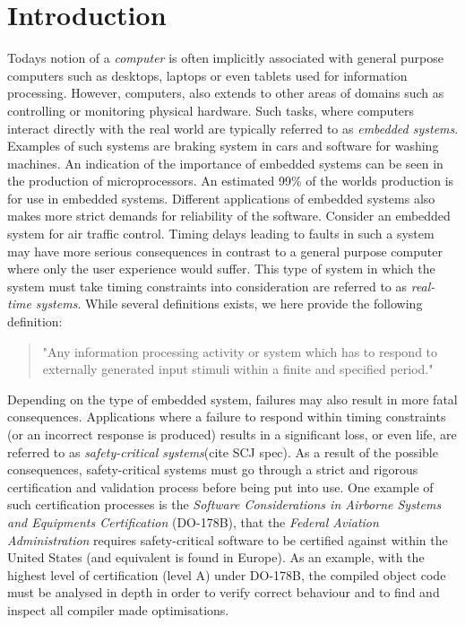 \chapter{Introduction}
\label{chapter:introduction}
Todays notion of a \textit{computer} is often implicitly associated with general purpose computers such as desktops, laptops or even tablets used for information processing. However, computers, also extends to other areas of domains such as controlling or monitoring physical hardware. Such tasks, where computers interact directly with the real world are typically referred to as \textit{embedded systems}. Examples of such systems are braking system in cars and software for washing machines. An indication of the importance of embedded systems can be seen in the production of microprocessors. An estimated 99\% of the worlds production is for use in embedded systems\cite{alan2001real}. Different applications of embedded systems also makes more strict demands for reliability of the software. Consider an embedded system for air traffic control. Timing delays leading to faults in such a system may have more serious consequences in contrast to a general purpose computer where only the user experience would suffer. This type of system in which the system must take timing constraints into consideration are referred to as \textit{real-time systems}. While several definitions exists, we here provide the following definition:

\begin{quotation}
"Any information processing activity or system which has to respond to externally generated input stimuli within a finite and specified period." \cite{alan2001real}
\end{quotation}

Depending on the type of embedded system, failures may also result in more fatal consequences. Applications where a failure to respond within timing constraints (or an incorrect response is produced) results in a significant loss, or even life, are referred to as \textit{safety-critical systems}(cite SCJ spec). As a result of the possible consequences, safety-critical systems must go through a strict and rigorous certification and validation process before being put into use. One example of such certification processes is the \textit{Software Considerations in Airborne Systems and Equipments Certification} (DO-178B)\cite{DO178B}, that the \textit{Federal Aviation Administration} requires safety-critical software to be certified against within the United States (and equivalent is found in Europe). As an example, with the highest level of certification (level A) under DO-178B, the compiled object code must be analysed in depth in order to verify correct behaviour and to find and inspect all compiler made optimisations\cite{DO178B-Example}.


